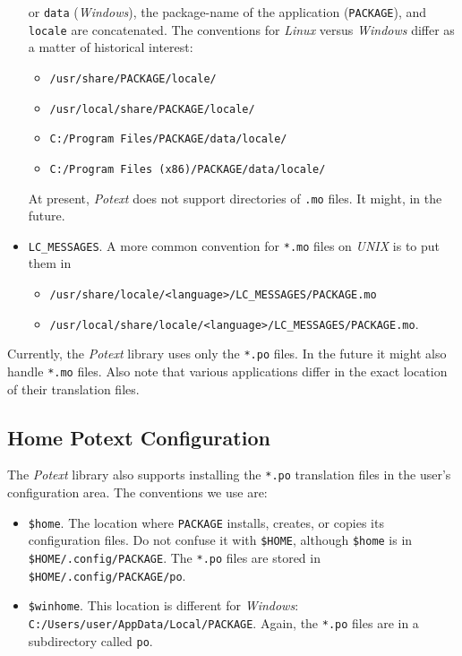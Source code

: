 \documentclass[
 11pt,
 twoside,
 a4paper,
 final                                 %
]{article}
\begin{document}
\begin{itemize}
         or \texttt{data} (\textsl{Windows}),
         the package-name of the application
         (\texttt{PACKAGE}), and \texttt{locale} are concatenated.
         The conventions for \textsl{Linux} versus \textsl{Windows}
         differ as a matter of historical interest:
         \begin{itemize}
            \item \texttt{/usr/share/PACKAGE/locale/}
            \item \texttt{/usr/local/share/PACKAGE/locale/}
            \item \texttt{C:/Program Files/PACKAGE/data/locale/}
            \item \texttt{C:/Program Files (x86)/PACKAGE/data/locale/}
         \end{itemize}
            At present, \textsl{Potext} does not support directories of
            \texttt{.mo} files. It might, in the future.
      \item \texttt{LC\_MESSAGES}. A more common convention for
            \texttt{*.mo} files on \textsl{UNIX} is to put them in
         \begin{itemize}
            \item \texttt{/usr/share/locale/<language>/LC\_MESSAGES/PACKAGE.mo}
            \item \texttt{/usr/local/share/locale/<language>/LC\_MESSAGES/PACKAGE.mo}.
         \end{itemize}
   \end{itemize}

   Currently, the \textsl{Potext} library uses only the \texttt{*.po} files.
   In the future it might also handle \texttt{*.mo} files.
   Also note that various applications differ in the exact location of their
   translation files.

\subsection{Home Potext Configuration}
\label{subsec:introduction_home_potext_configuration}

   The \textsl{Potext} library also supports installing the
   \texttt{*.po} translation files in the user's configuration area.
   The conventions we use are:

   \begin{itemize}
      \item \texttt{\$home}. The location where \texttt{PACKAGE} installs,
         creates, or copies its configuration files.
         Do not confuse it with \texttt{\$HOME},
         although \texttt{\$home} is in
         \texttt{\$HOME/.config/PACKAGE}.
         The \texttt{*.po} files are stored in
         \texttt{\$HOME/.config/PACKAGE/po}.
      \item \texttt{\$winhome}. This location is different for
         \textsl{Windows}:
         \texttt{C:/Users/user/AppData/Local/PACKAGE}.
         Again, the \texttt{*.po} files are in a
         subdirectory called \texttt{po}.
   \end{itemize}
\end{document}
